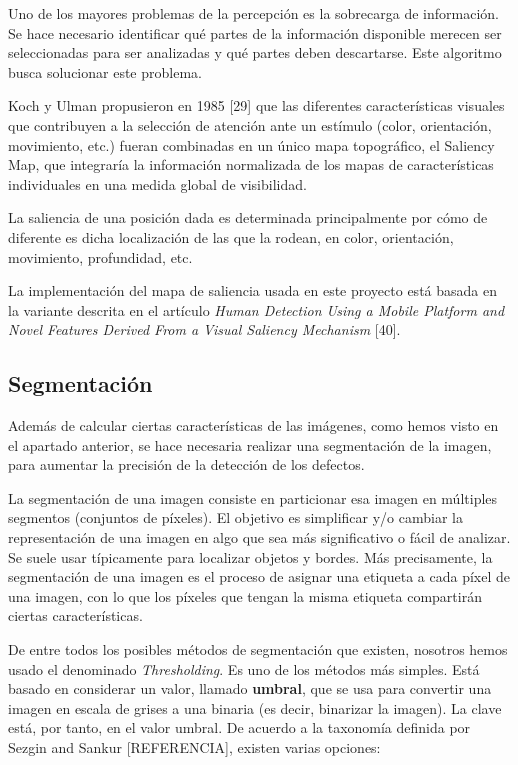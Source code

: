 Uno de los mayores problemas de la percepción es la sobrecarga de información. Se hace necesario identificar qué partes de la información disponible merecen ser seleccionadas para ser analizadas y qué partes deben descartarse. Este algoritmo busca solucionar este problema.

Koch y Ulman propusieron en 1985 [29] que las diferentes características visuales que contribuyen a la selección de atención ante un estímulo (color, orientación, movimiento, etc.) fueran combinadas en un único mapa topográfico, el Saliency Map, que integraría la información normalizada de los mapas de características individuales en una medida global de visibilidad.

La saliencia de una posición dada es determinada principalmente por cómo de diferente es dicha
localización de las que la rodean, en color, orientación, movimiento, profundidad, etc.

La implementación del mapa de saliencia usada en este proyecto está basada en la variante
descrita en el artículo \emph{Human Detection Using a Mobile Platform and Novel Features Derived
From a Visual Saliency Mechanism} [40].


\subsection{Segmentación}\label{segmentacion}
Además de calcular ciertas características de las imágenes, como hemos visto en el apartado anterior, se hace necesaria realizar una segmentación de la imagen, para aumentar la precisión de la detección de los defectos.

La segmentación de una imagen consiste en particionar esa imagen en múltiples segmentos (conjuntos de píxeles). El objetivo es simplificar y/o cambiar la representación de una imagen en algo que sea más significativo o fácil de analizar. Se suele usar típicamente para localizar objetos y bordes. Más precisamente, la segmentación de una imagen es el proceso de asignar una etiqueta a cada píxel de una imagen, con lo que los píxeles que tengan la misma etiqueta compartirán ciertas características.

De entre todos los posibles métodos de segmentación que existen, nosotros hemos usado el denominado \textit{Thresholding}. Es uno de los métodos más simples. Está basado en considerar un valor, llamado \textbf{umbral}, que se usa para convertir una imagen en escala de grises a una binaria (es decir, binarizar la imagen). La clave está, por tanto, en el valor umbral. De acuerdo a la taxonomía definida por Sezgin and Sankur [REFERENCIA], existen varias opciones:

